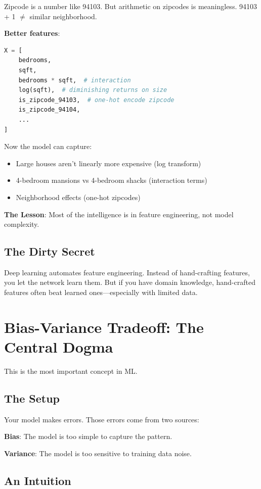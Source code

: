 Zipcode is a number like 94103. But arithmetic on zipcodes is meaningless. 94103 + 1 $\neq$ similar neighborhood.

\textbf{Better features}:
\begin{lstlisting}[language=Python]
X = [
    bedrooms,
    sqft,
    bedrooms * sqft,  # interaction
    log(sqft),  # diminishing returns on size
    is_zipcode_94103,  # one-hot encode zipcode
    is_zipcode_94104,
    ...
]
\end{lstlisting}

Now the model can capture:
\begin{itemize}
    \item Large houses aren't linearly more expensive (log transform)
    \item 4-bedroom mansions vs 4-bedroom shacks (interaction terms)
    \item Neighborhood effects (one-hot zipcodes)
\end{itemize}

\textbf{The Lesson}: Most of the intelligence is in feature engineering, not model complexity.

\subsection{The Dirty Secret}

Deep learning automates feature engineering. Instead of hand-crafting features, you let the network learn them. But if you have domain knowledge, hand-crafted features often beat learned ones—especially with limited data.

\section{Bias-Variance Tradeoff: The Central Dogma}

This is the most important concept in ML.

\subsection{The Setup}

Your model makes errors. Those errors come from two sources:

\textbf{Bias}: The model is too simple to capture the pattern.

\textbf{Variance}: The model is too sensitive to training data noise.

\subsection{An Intuition}

